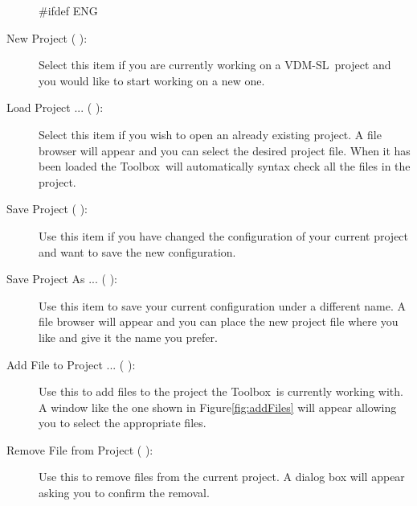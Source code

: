 \documentclass[\pformat,12pt]{article}
\newcommand{\vdmslpp}{VDM-SL}
\newcommand{\Toolbox}{Toolbox}
\newcommand{\vdmslpp}{VDM++}
\newcommand{\Toolbox}{Toolbox}
\newcommand{\guicmd}[1]{{\sf #1}}
\newcommand{\guicmd}[1]{{\gt #1}}
\begin{document}
\begin{description}

#ifdef ENG
\item[\guicmd{New Project} (\hspace{-1.8mm}
\raisebox{-0.8mm}{\texttt{[image: projectnew.png]}}):]
Select this item if you are currently working on 
  a \vdmslpp\ project and you would like to start working on a new
  one.

\item[\guicmd{Load Project ...} (\hspace{-1.2mm}
\raisebox{-0.8mm}{\texttt{[image: load.png]}}\hspace{.6mm}):]
Select this item if you wish to open an already 
  existing project. A file browser will appear and you can select the
  desired project file. When it has been loaded the \Toolbox\ will
  automatically syntax check all the files in the project.

\item[\guicmd{Save Project} (\hspace{-1.8mm}
\raisebox{-0.8mm}{\texttt{[image: projectsave.png]}}):]
  Use this item if you have changed the 
  configuration of your current project and want to save the new
  configuration.

\item[\guicmd{Save Project As ...} (\hspace{-1.5mm}
\raisebox{-0.8mm}{\texttt{[image: projectsaveas.png]}}):]
  Use this item to save your current 
  configuration under a different name. A file browser will appear and
  you can place the new project file where you like and give it the
  name you prefer.

\item[\guicmd{Add File to Project ...} (\hspace{-1.5mm}
\raisebox{-0.8mm}{\texttt{[image: plus.png]}}):] 
  Use this to add files to the
  project  the \Toolbox\ is currently working with. A window like the
  one shown in Figure\ref{fig:addFiles} will appear allowing you to
  select the appropriate files. 

\item[\guicmd{Remove File from Project} (\hspace{-1.5mm}
 \raisebox{-0.8mm}{\texttt{[image: minus.png]}}):]
 Use this to remove files from
 the current project. A dialog box will appear asking you to confirm
 the removal. 


\end{description}
\end{document}
